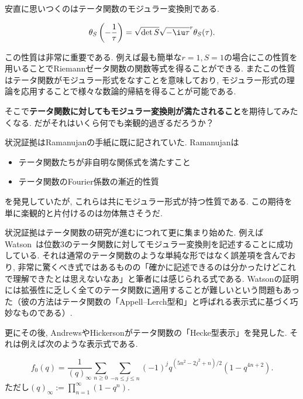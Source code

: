 \documentclass[11pt,b5paper,oneside,lualatex]{ltjsarticle} %
\numberwithin{equation}{section} %
\begin{document}
安直に思いつくのはテータ関数のモジュラー変換則である. 

\begin{prop}
	\label{prop:theta_modular_trans}
	\[
	\theta_S \left( -\frac{1}{\tau} \right) =
	\sqrt{\det S} \sqrt{-\iu \tau}^r \theta_S (\tau).
	\]
\end{prop}

この性質は非常に重要である. 
例えば最も簡単な$ r = 1, S = 1 $の場合にこの性質を用いることでRiemannゼータ関数の関数等式を得ることができる. 
またこの性質はテータ関数がモジュラー形式をなすことを意味しており, モジュラー形式の理論を応用することで様々な数論的帰結を得ることが可能である. 

そこで\textbf{テータ関数に対してもモジュラー変換則が満たされること}を期待してみたくなる. 
だがそれはいくら何でも楽観的過ぎるだろうか？

状況証拠はRamanujanの手紙に既に記されていた. 
Ramanujanは
\begin{itemize}
	\item {}テータ関数たちが非自明な関係式を満たすこと
	\item {}テータ関数のFourier係数の漸近的性質
\end{itemize}
を発見していたが, これらは共にモジュラー形式が持つ性質である. 
この期待を単に楽観的と片付けるのは勿体無さそうだ. 

状況証拠はテータ関数の研究が進むにつれて更に集まり始めた. 
例えばWatson~\cite[pp. 78]{Watson}は位数$ 3 $のテータ関数に対してモジュラー変換則を記述することに成功している. 
それは通常のテータ関数のような単純な形ではなく誤差項を含んでおり, 非常に驚くべき式ではあるものの「確かに記述できるのは分かったけどこれで理解できたとは思えないなあ」と筆者には感じられる式である. 
Watsonの証明には拡張性に乏しく全てのテータ関数に適用することが難しいという問題もあった（彼の方法はテータ関数の「Appell--Lerch型和」と呼ばれる表示式に基づく巧妙なものである）. 

更にその後, AndrewsやHickersonがテータ関数の「Hecke型表示」を発見した. 
それは例えば次のような表示式である. 

\begin{thm}
	\[
	f_0 (q) = \frac{1}{(q)_\infty}
	\sum_{n \ge 0} \sum_{-n \le j \le n} (-1)^j q^{(5n^2 - 2j^2 + n)/2} (1 - q^{4n+2}).
	\]
	ただし$ (q)_\infty := \prod_{n=1}^{\infty} (1 - q^n) $.
\end{thm}
\end{document}
